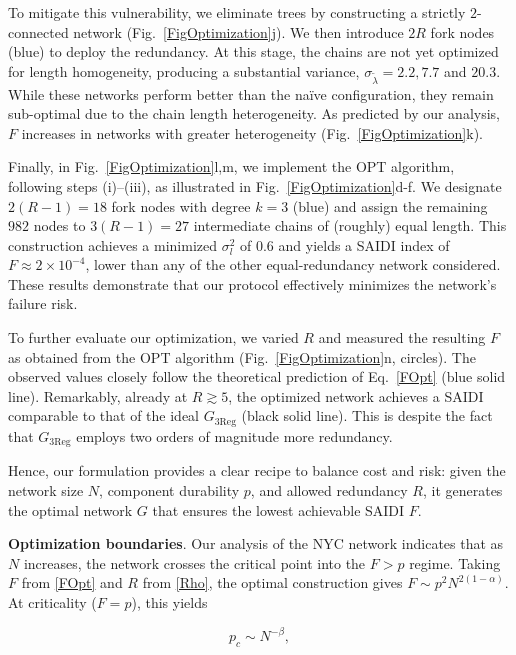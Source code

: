 \documentclass[oneside, a4paper, onecolumn, 11pt]{article}
\begin{document}
\begin{refsection}
To mitigate this vulnerability, we eliminate trees by constructing a strictly $2$-connected network (Fig.~\ref{FigOptimization}j). We then introduce $2R$ fork nodes (blue) to deploy the redundancy. At this stage, the chains are not yet optimized for length homogeneity, producing a substantial variance, $\sigma_{\tilde \lambda} = 2.2,7.7$ and $20.3$. While these networks perform better than the na\"{i}ve configuration, they remain sub-optimal due to the chain length heterogeneity. As predicted by our analysis, $F$ increases in networks with greater heterogeneity (Fig.~\ref{FigOptimization}k). 

Finally, in Fig.~\ref{FigOptimization}l,m, we implement the OPT algorithm, following steps (i)–(iii), as illustrated in Fig.\ \ref{FigOptimization}d-f. We designate $2(R - 1) = 18$ fork nodes with degree $k = 3$ (blue) and assign the remaining $982$ nodes to $3(R - 1) = 27$ intermediate chains of (roughly) equal length. This construction achieves a minimized $\sigma_l^2$ of $0.6$ and yields a SAIDI index of $F \approx 2 \times 10^{-4}$,  lower than any of the other equal-redundancy network considered. These results demonstrate that our protocol effectively minimizes the network’s failure risk.

To further evaluate our optimization, we varied $R$ and measured the resulting $F$ as obtained from the OPT algorithm (Fig.~\ref{FigOptimization}n, circles). The observed values closely follow the theoretical prediction of Eq.~\eqref{FOpt} (blue solid line). Remarkably, already at $R \gtrsim 5$, the optimized network achieves a SAIDI comparable to that of the ideal $G_{3\text{Reg}}$ (black solid line). This is despite the fact that $G_{3\text{Reg}}$ employs two orders of magnitude more redundancy.

Hence, our formulation provides a clear recipe to balance cost and risk: given the network size $N$, component durability $p$, and allowed redundancy $R$, it generates the optimal network $G$ that ensures the lowest achievable SAIDI $F$.     

\vspace{3mm}
\textbf{\color{blue} Optimization boundaries}.
Our analysis of the NYC network indicates that as $N$ increases, the network crosses the critical point into the $F > p$ regime. Taking $F$ from \eqref{FOpt} and $R$ from \eqref{Rho}, the optimal construction gives $F \sim p^2 N^{2(1 - \alpha)}$. At criticality ($F = p$), this yields

\begin{equation}
p_c \sim N^{-\beta},
\label{PcOpt}
\end{equation}


\end{refsection}
\end{document}
